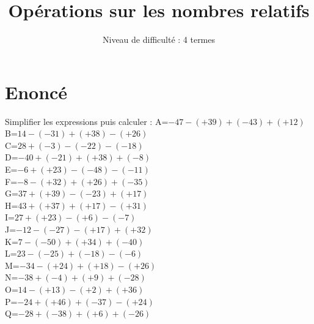 \documentclass{article}%
\title{Opérations sur les nombres relatifs}%
\author{Niveau de difficulté : 4 termes}%
\date{{}}%
\begin{document}
%
\normalsize%
\pagestyle{empty}%
\maketitle%
\section{Enoncé}%
\label{sec:Enonc}%
Simplifier les expressions puis calculer :%
\newline%
%
\newline%
%
A=$-47-(+39)+(-43)+(+12)$\\%
\vspace{0.35cm}%
B=$14-(-31)+(+38)-(+26)$\\%
\vspace{0.35cm}%
C=$28+(-3)-(-22)-(-18)$\\%
\vspace{0.35cm}%
D=$-40+(-21)+(+38)+(-8)$\\%
\vspace{0.35cm}%
E=$-6+(+23)-(-48)-(-11)$\\%
\vspace{0.35cm}%
F=$-8-(+32)+(+26)+(-35)$\\%
\vspace{0.35cm}%
G=$37+(+39)-(-23)+(+17)$\\%
\vspace{0.35cm}%
H=$43+(+37)+(+17)-(+31)$\\%
\vspace{0.35cm}%
I=$27+(+23)-(+6)-(-7)$\\%
\vspace{0.35cm}%
J=$-12-(-27)-(+17)+(+32)$\\%
\vspace{0.35cm}%
K=$7-(-50)+(+34)+(-40)$\\%
\vspace{0.35cm}%
L=$23-(-25)+(-18)-(-6)$\\%
\vspace{0.35cm}%
M=$-34-(+24)+(+18)-(+26)$\\%
\vspace{0.35cm}%
N=$-38+(-4)+(+9)+(-28)$\\%
\vspace{0.35cm}%
O=$14-(+13)-(+2)+(+36)$\\%
\vspace{0.35cm}%
P=$-24+(+46)+(-37)-(+24)$\\%
\vspace{0.35cm}%
Q=$-28+(-38)+(+6)+(-26)$\\%
\end{document}
